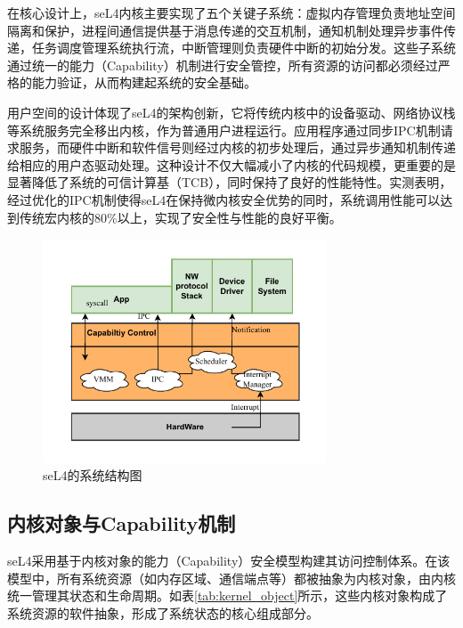 在核心设计上，seL4内核主要实现了五个关键子系统：虚拟内存管理负责地址空间隔离和保护，进程间通信提供基于消息传递的交互机制，通知机制处理异步事件传递，任务调度管理系统执行流，中断管理则负责硬件中断的初始分发。这些子系统通过统一的能力（Capability）机制进行安全管控，所有资源的访问都必须经过严格的能力验证，从而构建起系统的安全基础。

用户空间的设计体现了seL4的架构创新，它将传统内核中的设备驱动、网络协议栈等系统服务完全移出内核，作为普通用户进程运行。应用程序通过同步IPC机制请求服务，而硬件中断和软件信号则经过内核的初步处理后，通过异步通知机制传递给相应的用户态驱动处理。这种设计不仅大幅减小了内核的代码规模，更重要的是显著降低了系统的可信计算基（TCB），同时保持了良好的性能特性。实测表明，经过优化的IPC机制使得seL4在保持微内核安全优势的同时，系统调用性能可以达到传统宏内核的80\%\cite{heiser2016l4}以上，实现了安全性与性能的良好平衡。

\begin{figure}[htbp]
  \centering
  \includegraphics[width=0.75\textwidth]{figures/seL4_framwork.drawio.pdf}
  \caption{seL4的系统结构图}\label{fig:seL4_frramework}
\end{figure}

\subsection{内核对象与Capability机制}
seL4采用基于内核对象的能力（Capability）安全模型构建其访问控制体系。在该模型中，所有系统资源（如内存区域、通信端点等）都被抽象为内核对象，由内核统一管理其状态和生命周期。如表\ref{tab:kernel_object}所示，这些内核对象构成了系统资源的软件抽象，形成了系统状态的核心组成部分。

